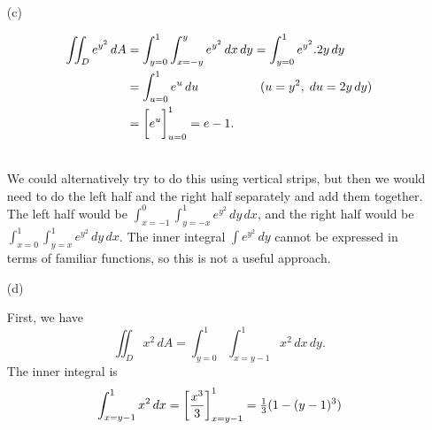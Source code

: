 \documentclass[a4paper]{amsart}
\renewenvironment{solution}{\SolutionInline}{\endSolutionInline}
\begin{document}
\begin{solution}
\begin{itemize}
{
   }\\[2ex]
  \item[(c)] 
   \begin{minipage}[t]{11cm}
     \begin{align*}
      \iint_D e^{y^2}\,dA
       &= \int_{y=0}^1\int_{x=-y}^y e^{y^2}\,dx\,dy 
        = \int_{y=0}^1 e^{y^2}.2y\,dy \\
       &= \int_{u=0}^1 e^u \,du
          \hspace{5em} (u=y^2,\;du=2y\,dy) \\
       &= \CH{e^u}_{u=0}^1 = e-1.
     \end{align*}
   \end{minipage} \hfill \parbox[t]{5cm}{
   }\\[2ex]
   We could alternatively try to do this using vertical strips, but
   then we would need to do the left half and the right half
   separately and add them together.  The left half would be
   $\int_{x=-1}^0\int_{y=-x}^1e^{y^2}\,dy\,dx$, and the right half
   would be $\int_{x=0}^1\int_{y=x}^1e^{y^2}\,dy\,dx$.  The inner
   integral $\int e^{y^2}\,dy$ cannot be expressed in terms of
   familiar functions, so this is not a useful approach.
  \item[(d)] 
   \begin{minipage}[t]{11cm}
     First, we have
     \[ \iint_D x^2\,dA = \int_{y=0}^1\int_{x=y-1}^1 x^2\,dx\,dy. \]
     The inner integral is
     \begin{align*}
      \int_{x=y-1}^1 x^2\,dx 
       &= \CH{\frac{x^3}{3}}_{x=y-1}^1 
        = \tfrac{1}{3}(1 - (y-1)^3) \\

\end{align*}
\end{minipage}
\end{itemize}
\end{solution}
\end{document}
